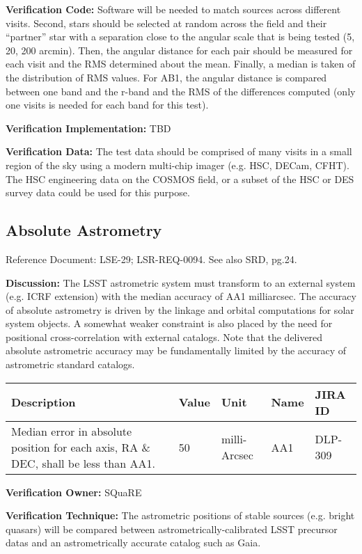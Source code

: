 \documentclass[DM,lsstdraft,toc]{lsstdoc}
\begin{document}
\textbf{Verification Code:} Software will be needed to match sources
across different visits. Second, stars should be selected at random
across the field and their ``partner'' star with a separation close to
the angular scale that is being tested (5, 20, 200 arcmin). Then, the
angular distance for each pair should be measured for each visit and the
RMS determined about the mean. Finally, a median is taken of the
distribution of RMS values. For AB1, the angular distance is compared
between one band and the r-band and the RMS of the differences computed
(only one visits is needed for each band for this test).

\textbf{Verification Implementation:} TBD

\textbf{Verification Data:} The test data should be comprised of many
visits in a small region of the sky using a modern multi-chip imager
(e.g. HSC, DECam, CFHT). The HSC engineering data on the COSMOS field,
or a subset of the HSC or DES survey data could be used for this
purpose.

\subsection{Absolute Astrometry}\label{absolute-astrometry}

Reference Document: LSE-29; LSR-REQ-0094. See also SRD, pg.24.

\textbf{Discussion:} The LSST astrometric system must transform to an
external system (e.g. ICRF extension) with the median accuracy of AA1
milliarcsec. The accuracy of absolute astrometry is driven by the
linkage and orbital computations for solar system objects. A somewhat
weaker constraint is also placed by the need for positional
cross-correlation with external catalogs. Note that the delivered
absolute astrometric accuracy may be fundamentally limited by the
accuracy of astrometric standard catalogs.

\begin{longtable}[]{@{}p{}llll@{}}
\toprule
Description & Value & Unit & Name & JIRA ID\tabularnewline
\midrule
\endhead
Median error in absolute position for each axis, RA \& DEC, shall be
less than AA1. & 50 & milli-Arcsec & AA1 & DLP-309\tabularnewline
\bottomrule
\end{longtable}

\textbf{Verification Owner:} SQuaRE

\textbf{Verification Technique:} The astrometric positions of stable
sources (e.g. bright quasars) will be compared between
astrometrically-calibrated LSST precursor datas and an astrometrically
accurate catalog such as Gaia.
\end{document}
